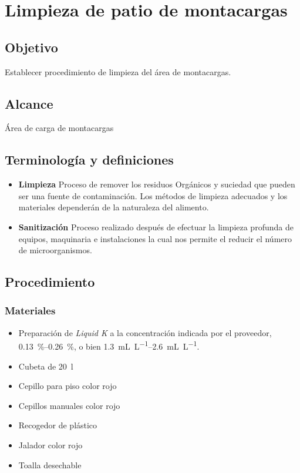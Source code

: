 \thispagestyle{formato-PI}
\renewcommand{\MenorVer}{0}
\renewcommand{\MayorVer}{2}
\renewcommand{\Codigo}{HYS-11-IT}
\renewcommand{\FechaPub}{2023--01}
\renewcommand{\Titulo}{Limpieza de patio de montacargas}

\section{\Titulo}

\subsection{Objetivo}
Establecer procedimiento de limpieza del área de montacargas.

\subsection{Alcance}
Área de carga de montacargas

\subsection{Terminología y definiciones}
\begin{itemize}
	\item \textbf{Limpieza} Proceso de remover los residuos Orgánicos y suciedad que pueden ser una fuente de contaminación. Los métodos de limpieza adecuados y los materiales dependerán de la naturaleza del alimento.
	\item \textbf{Sanitización} Proceso realizado después de efectuar la limpieza profunda de equipos, maquinaria e instalaciones la cual nos permite el reducir el número de microorganismos.
\end{itemize}

\subsection{Procedimiento}

\subsubsection{Materiales}

\begin{itemize}
	\item Preparación de \emph{Liquid K} a la concentración indicada por el proveedor, \qtyrange{0.13}{0.26}{\percent}, o bien \qtyrange{1.3}{2.6}{\milli\liter\per\liter}.
	\item Cubeta de \qty{20}{\litre}
	\item Cepillo para piso color rojo
	\item Cepillos manuales color rojo
	\item Recogedor de plástico
	\item Jalador color rojo
	\item Toalla desechable
\end{itemize}

